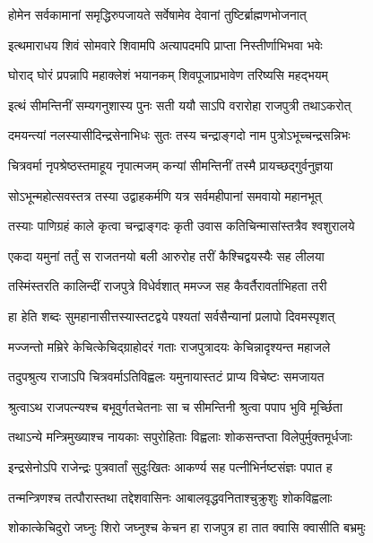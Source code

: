 \twolineshloka
{होमेन सर्वकामानां समृद्धिरुपजायते}
{सर्वेषामेव देवानां तुष्टिर्ब्राह्मणभोजनात्} %

\twolineshloka
{इत्थमाराधय शिवं सोमवारे शिवामपि}
{अत्यापदमपि प्राप्ता निस्तीर्णाभिभवा भवेः} %

\twolineshloka
{घोराद् घोरं प्रपन्नापि महाक्लेशं भयानकम्}
{शिवपूजाप्रभावेण तरिष्यसि महद्भयम्} %

\twolineshloka
{इत्थं सीमन्तिनीं सम्यगनुशास्य पुनः सती}
{ययौ साऽपि वरारोहा राजपुत्री तथाऽकरोत्} %

\twolineshloka
{दमयन्त्यां नलस्यासीदिन्द्रसेनाभिधः सुतः}
{तस्य चन्द्राङ्गदो नाम पुत्रोऽभूच्चन्द्रसन्निभः} %

\twolineshloka
{चित्रवर्मा नृपश्रेष्ठस्तमाहूय नृपात्मजम्}
{कन्यां सीमन्तिनीं तस्मै प्रायच्छद्गुर्वनुज्ञया} %

\twolineshloka
{सोऽभून्महोत्सवस्तत्र तस्या उद्वाहकर्मणि}
{यत्र सर्वमहीपानां समवायो महानभूत्} %

\twolineshloka
{तस्याः पाणिग्रहं काले कृत्वा चन्द्राङ्गदः कृती}
{उवास कतिचिन्मासांस्तत्रैव श्वशुरालये} %

\twolineshloka
{एकदा यमुनां तर्तुं स राजतनयो बली}
{आरुरोह तरीं कैश्चिद्वयस्यैः सह लीलया} %

\twolineshloka
{तस्मिंस्तरति कालिन्दीं राजपुत्रे विधेर्वशात्}
{ममज्ज सह कैवर्तैरावर्ताभिहता तरी} %

\twolineshloka
{हा हेति शब्दः सुमहानासीत्तस्यास्तटद्वये}
{पश्यतां सर्वसैन्यानां प्रलापो दिवमस्पृशत्} %

\twolineshloka
{मज्जन्तो मम्रिरे केचित्केचिद्ग्राहोदरं गताः}
{राजपुत्रादयः केचिन्नादृश्यन्त महाजले} %

\twolineshloka
{तदुपश्रुत्य राजाऽपि चित्रवर्माऽतिविह्वलः}
{यमुनायास्तटं प्राप्य विचेष्टः समजायत} %

\twolineshloka
{श्रुत्वाऽथ राजपत्न्यश्च बभूवुर्गतचेतनाः}
{सा च सीमन्तिनी श्रुत्वा पपाप भुवि मूर्च्छिता} %

\twolineshloka
{तथाऽन्ये मन्त्रिमुख्याश्च नायकाः सपुरोहिताः}
{विह्वलाः शोकसन्तप्ता विलेपुर्मुक्तमूर्धजाः} %

\twolineshloka
{इन्द्रसेनोऽपि राजेन्द्रः पुत्रवार्तां सुदुःखितः}
{आकर्ण्य सह पत्नीभिर्नष्टसंज्ञः पपात ह} %

\twolineshloka
{तन्मन्त्रिणश्च तत्पौरास्तथा तद्देशवासिनः}
{आबालवृद्धवनिताश्चुक्रुशुः शोकविह्वलाः} %

\twolineshloka
{शोकात्केचिदुरो जघ्नुः शिरो जघ्नुश्च केचन}
{हा राजपुत्र हा तात क्वासि क्वासीति बभ्रमुः} %

